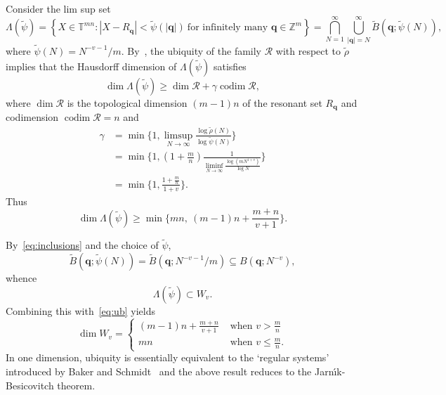 \documentclass[reqno]{amsart}
\renewcommand{\ge}{\geqslant}
\renewcommand{\le}{\leqslant}
\newcommand{\T}{{\mathbb{T}}}
\newcommand{\Z}{{\mathbb{Z}}}
\newcommand{\0}{{\mathbf{0}}}
\newcommand{\q}{{\mathbf{q}}}
\newcommand{\HD}{Hausdorff dimension}
\newcommand{\codim}{\operatorname{codim}}
\newcommand{\JB}{Jarn\'{\i}k-Besicovitch}
\newcommand{\cR}{\mathcal{R}}
\newcommand{\tB}{\widetilde{B}}
\def\tB{\widetilde{B}}
\def\Rq{R_{\q}}
\def\tp{\widetilde{\psi}}
\def\tr{\tilde{\rho}}
\begin{document}
Consider the lim sup set
\begin{equation*}
  \Lambda(\tp)=\left\{X\in \T^{mn}\colon \left|X-\Rq\right|
    < \tp(|\q|) \ \text{for infinitely many } \q\in\Z^m\right\} 
= \bigcap_{N=1}^{\infty} \bigcup_{|\q|=N}^{\infty}
  \widetilde{B}(\q;\tp(N)),
\end{equation*}
where $\tp(N)= N^{-v-1}/m$. 
By~\cite{mmd92,DRV90a}, the ubiquity of the family $\cR$
with respect to $\tr$ implies that the \HD{} of $\Lambda(\tp)$ 
satisfies
\begin{equation*}
  \dim \Lambda(\tp)\ge \dim \cR + \gamma \codim \cR,
\end{equation*}
where $\dim \cR$ is the topological dimension $(m-1)n$ of the resonant
set $\Rq$ and codimension $\codim \cR=n$ and
\begin{align*}
  \gamma &
  = \min\biggl\{1,\limsup_{N\to\infty}\frac{\log \tr(N)}{\log \tp(N)}\biggr\} \\
  &= \min\biggl\{ 1, (1+\frac{m}{n}) \frac1
  {\liminf_{N\to\infty}\frac{\log (mN^{1+v})}{\log N}}
  \biggr\} \\
  &= \min\biggl\{1, \frac{1+\frac{m}{n}}{1+v} \biggr\}.
  \end{align*}
Thus 
$$
\dim \Lambda(\tp)  \ge \min\bigl\{mn,\ (m-1)n + \frac{m+n}{v+1} \bigr\}. 
$$



By~\eqref{eq:inclusions} and the choice of $\tp$,
$$
\tB(\q;\tp(N)) =\tB(\q;N^{-v-1}/m) \subseteq B(\q;N^{-v}),
$$
whence
$$
\Lambda(\tp) \subset W_v. 
$$
Combining this with~\eqref{eq:ub} yields
\begin{equation*}
    \dim W_v=
    \begin{cases}
      (m-1)n + \frac{m+n}{v +1} & \text{ when }
      v > \frac{m}{n} \\
      mn & \text{ when } v \le \frac{m}{n}.
    \end{cases}
\end{equation*}
In one dimension, ubiquity is essentially equivalent to the `regular
systems' introduced by Baker and Schmidt~\cite{BS} and the above
result reduces to the \JB{} theorem.
\end{document}
